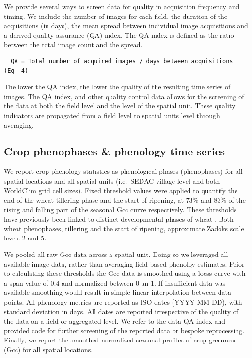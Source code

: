 \documentclass[, manuscript]{copernicus}
\begin{document}
We provide several ways to screen data for quality in acquisition
frequency and timing. We include the number of images for each field,
the duration of the acquisitions (in days), the mean spread between
individual image acquisitions and a derived quality assurance (QA)
index. The QA index is defined as the ratio between the total image
count and the spread.

\begin{verbatim}
  QA = Total number of acquired images / days between acquisitions (Eq. 4)
\end{verbatim}

The lower the QA index, the lower the quality of the resulting time
series of images. The QA index, and other quality control data allows
for the screening of the data at both the field level and the level of
the spatial unit. These quality indicators are propagated from a field
level to spatial units level through averaging.

\subsection{Crop phenophases \& phenology time series}

We report crop phenology statistics as phenological phases (phenophases)
for all spatial locations and all spatial units (i.e.~SEDAC village
level and both WorldClim grid cell sizes). Fixed threshold values were
applied to quantify the end of the wheat tillering phase and the start
of ripening, at 73\% and 83\% of the rising and falling part of the
seasonal Gcc curve respectively. These thresholds have previously been
linked to distinct developmental phases of wheat \citep{hufkens2019}.
Both wheat phenophases, tillering and the start of ripening, approximate
Zadoks scale levels 2 and 5.

We pooled all raw Gcc data across a spatial unit. Doing so we leveraged
all available image data, rather than averaging field based phenoloy
estimates. Prior to calculating these thresholds the Gcc data is
smoothed using a loess curve with a span value of 0.4 and normalized
between 0 an 1. If insufficient data was available smoothing would
result in simple linear interpolation between data points. All phenology
metrics are reported as ISO dates (YYYY-MM-DD), with standard deviation
in days. All dates are reported irrespective of the quality of the data
on a field or aggregated level. We refer to the data QA index and
provided code for further screening of the reported data or bespoke
reprocessing. Finally, we report the smoothed normalized seasonal
profiles of crop greenness (Gcc) for all spatial locations.
\end{document}
